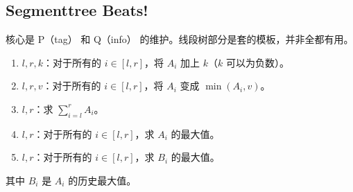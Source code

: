 \documentclass[12pt]{ctexart}
\begin{document}
\subsection{Segmenttree Beats!}
核心是 P（tag） 和 Q（info） 的维护。线段树部分是套的模板，并非全都有用。
\begin{enumerate}
	\item $l,r,k$：对于所有的 $i\in[l,r]$，将 $A_i$ 加上 $k$（$k$ 可以为负数）。
	\item $l,r,v$：对于所有的 $i\in[l,r]$，将 $A_i$ 变成 $\min(A_i,v)$。
	\item $l,r$：求 $\sum\limits_{i=l}^{r}A_i$。
	\item $l,r$：对于所有的 $i\in[l,r]$，求 $A_i$ 的最大值。
	\item $l,r$：对于所有的 $i\in[l,r]$，求 $B_i$ 的最大值。
\end{enumerate}
其中 $B_i$ 是 $A_i$ 的历史最大值。
\end{document}
